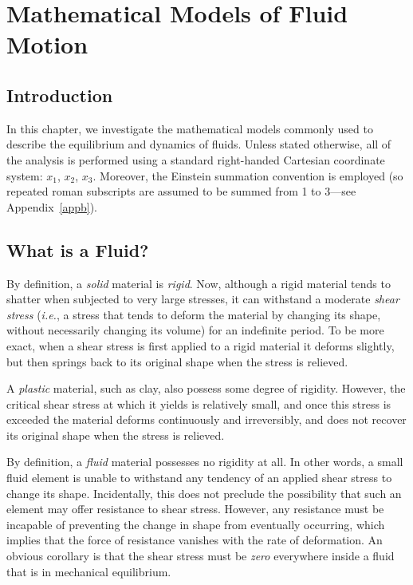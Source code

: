 \chapter{Mathematical Models of Fluid Motion}\label{c4}
\section{Introduction}
In this chapter, we  investigate the mathematical models commonly used to describe the equilibrium and
dynamics of fluids. Unless
stated otherwise, all of the analysis is performed using a standard right-handed Cartesian coordinate
system: $x_1$, $x_2$, $x_3$. Moreover, the Einstein summation convention is employed (so repeated roman subscripts are assumed to be summed from 1 to 3---see Appendix~\ref{appb}). 

\section{What is a Fluid?}\label{s4.1}
By definition, a {\em solid}\/ material  is {\em rigid}. Now, although a rigid
material tends to shatter when subjected to very large stresses, it can withstand a moderate
{\em shear stress}\/ ({\em i.e.}, a stress that tends to deform the material by changing its shape, without necessarily changing its volume)
for an indefinite period. To be more exact, when a shear stress is first applied to a rigid material it deforms slightly, but
then springs back to its original shape when the stress is relieved. 

A {\em plastic}\/ material, such as clay,
also possess some degree of rigidity. However, the critical shear stress at which it yields is relatively
small, and once this stress is exceeded the material deforms continuously and
irreversibly, and does not recover its original shape when the stress is relieved. 

By definition, a  {\em fluid}\/ material possesses no rigidity at all.
In other words, a  small fluid element is  unable to withstand any tendency of an applied shear stress to
change its shape.  Incidentally, this  does not
preclude the possibility that such an element may offer resistance
to  shear stress. However, any  resistance must be incapable of preventing the
change in shape from eventually occurring, which  implies that the force of resistance
vanishes with the rate of deformation. An obvious corollary is that the shear stress must
be {\em zero}\/ everywhere inside a fluid that is in mechanical equilibrium. 

